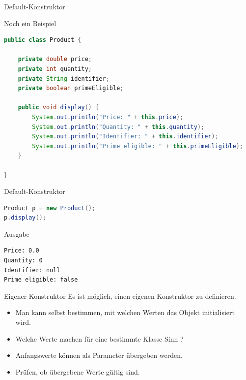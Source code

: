 \documentclass[18pt]{beamer}
\begin{document}
\begin{frame}[fragile]{Default-Konstruktor}
    \begin{exampleblock}{Noch ein Beispiel}
        \begin{lstlisting}[language=Java,basicstyle=\scriptsize]
public class Product {

    private double price;
    private int quantity;
    private String identifier;
    private boolean primeEligible;

    public void display() {
        System.out.println("Price: " + this.price);
        System.out.println("Quantity: " + this.quantity);
        System.out.println("Identifier: " + this.identifier);
        System.out.println("Prime eligible: " + this.primeEligible);
    }

}
        \end{lstlisting}

    \end{exampleblock}

\end{frame}

\begin{frame}[fragile]{Default-Konstruktor}
\begin{exampleblock}{}
    \begin{lstlisting}[language=Java]
Product p = new Product();
p.display();
    \end{lstlisting}
\end{exampleblock}

    \begin{exampleblock}{Ausgabe}
        \begin{lstlisting}
Price: 0.0
Quantity: 0
Identifier: null
Prime eligible: false
        \end{lstlisting}

    \end{exampleblock}

\end{frame}

\begin{frame}{Eigener Konstruktor}
    Es ist möglich, einen eigenen Konstruktor zu definieren.
    \begin{itemize}
        \item Man kann selbst bestimmen, mit welchen Werten das Objekt initialisiert wird.
        \item Welche Werte machen für eine bestimmte Klasse Sinn ?
        \item Anfangswerte können als Parameter übergeben werden.
        \item Prüfen, ob übergebene Werte gültig sind.
    \end{itemize}
\end{frame}
\end{document}
